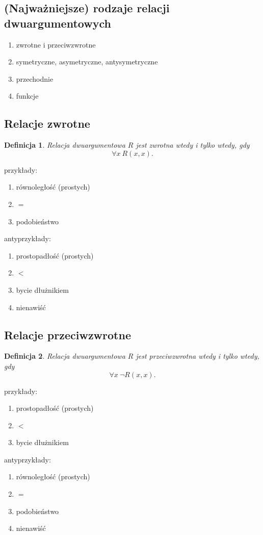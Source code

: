 \documentclass[12pt]{article}
\newtheorem{definicja}{Definicja}
\begin{document}
\subsection{(Najważniejsze) rodzaje relacji dwuargumentowych}
%
\begin{enumerate}
\item zwrotne i przeciwzwrotne
\item symetryczne, asymetryczne, antysymetryczne
\item przechodnie
\item funkcje
\end{enumerate}
%

\subsection{Relacje zwrotne}
%
\begin{definicja}
Relacja dwuargumentowa $R$ jest \emph{zwrotna} wtedy i tylko wtedy, gdy $$\forall x ~R(x,x).$$
\end{definicja}
%
przykłady:
\begin{enumerate}
\item równoległość (prostych)
\item $=$
\item podobieństwo
\end{enumerate}
%
antyprzykłady:
\begin{enumerate}
\item prostopadłość (prostych)
\item $<$
\item bycie dłużnikiem
\item nienawiść
\end{enumerate}
%

\subsection{Relacje przeciwzwrotne}
%
\begin{definicja}
Relacja dwuargumentowa $R$ jest \emph{przeciwzwrotna} wtedy i tylko wtedy, gdy $$\forall x ~\neg R(x,x).$$
\end{definicja}
%
przykłady:
\begin{enumerate}
\item prostopadłość (prostych)
\item $<$
\item bycie dłużnikiem
\end{enumerate}
antyprzykłady:
\begin{enumerate}
\item równoległość (prostych)
\item $=$
\item podobieństwo
\item nienawiść
\end{enumerate}
%
\end{document}
